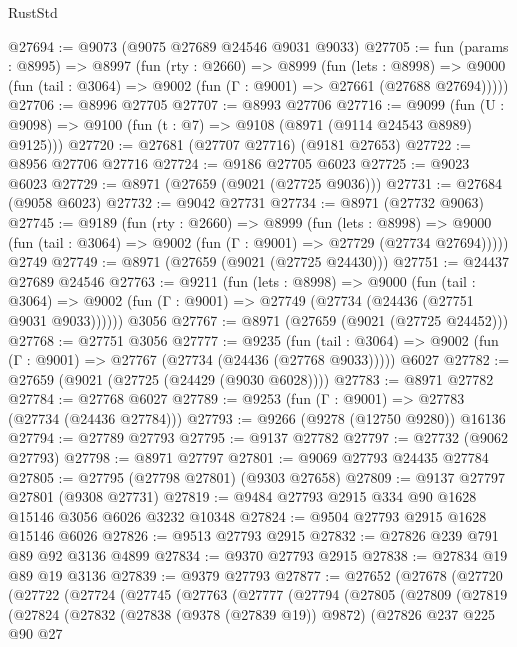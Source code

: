 \begin{lexlean}{RustStd}
\begin{coremodule}
@27694 := @9073 (@9075 @27689 @24546 @9031 @9033)
@27705 := fun (params : @8995) =>
  @8997
    (fun (rty : @2660) =>
    @8999
      (fun (lets : @8998) =>
      @9000 (fun (tail : @3064) => @9002 (fun (Γ : @9001) => @27661 (@27688 @27694)))))
@27706 := @8996 @27705
@27707 := @8993 @27706
@27716 := @9099
    (fun (U : @9098) => @9100 (fun (t : @7) => @9108 (@8971 (@9114 @24543 @8989) @9125)))
@27720 := @27681 (@27707 @27716) (@9181 @27653)
@27722 := @8956 @27706 @27716
@27724 := @9186 @27705 @6023
@27725 := @9023 @6023
@27729 := @8971 (@27659 (@9021 (@27725 @9036)))
@27731 := @27684 (@9058 @6023)
@27732 := @9042 @27731
@27734 := @8971 (@27732 @9063)
@27745 := @9189
    (fun (rty : @2660) =>
    @8999
      (fun (lets : @8998) =>
      @9000 (fun (tail : @3064) => @9002 (fun (Γ : @9001) => @27729 (@27734 @27694)))))
    @2749
@27749 := @8971 (@27659 (@9021 (@27725 @24430)))
@27751 := @24437 @27689 @24546
@27763 := @9211
    (fun (lets : @8998) =>
    @9000
      (fun (tail : @3064) =>
      @9002 (fun (Γ : @9001) => @27749 (@27734 (@24436 (@27751 @9031 @9033))))))
    @3056
@27767 := @8971 (@27659 (@9021 (@27725 @24452)))
@27768 := @27751 @3056
@27777 := @9235
    (fun (tail : @3064) => @9002 (fun (Γ : @9001) => @27767 (@27734 (@24436 (@27768 @9033)))))
    @6027
@27782 := @27659 (@9021 (@27725 (@24429 (@9030 @6028))))
@27783 := @8971 @27782
@27784 := @27768 @6027
@27789 := @9253 (fun (Γ : @9001) => @27783 (@27734 (@24436 @27784)))
@27793 := @9266 (@9278 (@12750 @9280)) @16136
@27794 := @27789 @27793
@27795 := @9137 @27782
@27797 := @27732 (@9062 @27793)
@27798 := @8971 @27797
@27801 := @9069 @27793 @24435 @27784
@27805 := @27795 (@27798 @27801) (@9303 @27658)
@27809 := @9137 @27797 @27801 (@9308 @27731)
@27819 := @9484 @27793 @2915 @334 @90 @1628 @15146 @3056 @6026 @3232 @10348
@27824 := @9504 @27793 @2915 @1628 @15146 @6026
@27826 := @9513 @27793 @2915
@27832 := @27826 @239 @791 @89 @92 @3136 @4899
@27834 := @9370 @27793 @2915
@27838 := @27834 @19 @89 @19 @3136
@27839 := @9379 @27793
@27877 := @27652
    (@27678
      (@27720
        (@27722
          (@27724
            (@27745
              (@27763
                (@27777
                  (@27794
                    (@27805
                      (@27809
                        (@27819
                          (@27824
                            (@27832
                              (@27838 (@9378 (@27839 @19)) @9872)
                              (@27826
                                @237
                                @225
                                @90
                                @27

\end{coremodule}
\end{lexlean}
